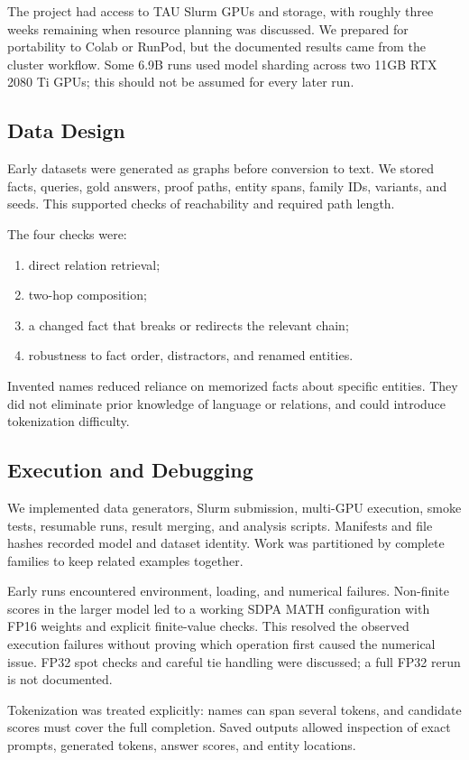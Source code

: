 \documentclass[11pt,a4paper]{article}
\begin{document}
The project had access to TAU Slurm GPUs and storage, with roughly three weeks remaining when resource planning was discussed. We prepared for portability to Colab or RunPod, but the documented results came from the cluster workflow. Some 6.9B runs used model sharding across two 11GB RTX 2080 Ti GPUs; this should not be assumed for every later run.

\subsection{Data Design}
Early datasets were generated as graphs before conversion to text. We stored facts, queries, gold answers, proof paths, entity spans, family IDs, variants, and seeds. This supported checks of reachability and required path length.

The four checks were:
\begin{enumerate}
\item direct relation retrieval;
\item two-hop composition;
\item a changed fact that breaks or redirects the relevant chain;
\item robustness to fact order, distractors, and renamed entities.
\end{enumerate}
Invented names reduced reliance on memorized facts about specific entities. They did not eliminate prior knowledge of language or relations, and could introduce tokenization difficulty.

\subsection{Execution and Debugging}
We implemented data generators, Slurm submission, multi-GPU execution, smoke tests, resumable runs, result merging, and analysis scripts. Manifests and file hashes recorded model and dataset identity. Work was partitioned by complete families to keep related examples together.

Early runs encountered environment, loading, and numerical failures. Non-finite scores in the larger model led to a working SDPA MATH configuration with FP16 weights and explicit finite-value checks. This resolved the observed execution failures without proving which operation first caused the numerical issue. FP32 spot checks and careful tie handling were discussed; a full FP32 rerun is not documented.

Tokenization was treated explicitly: names can span several tokens, and candidate scores must cover the full completion. Saved outputs allowed inspection of exact prompts, generated tokens, answer scores, and entity locations.
\end{document}
